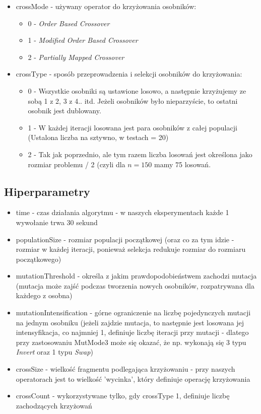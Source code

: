 \documentclass{article}
\begin{document}
\begin{itemize}
	\item crossMode	- używany operator do krzyżowania osobników:
		\begin{itemize}
			\item 0 - \textit{Order Based Crossover}
			\item 1 - \textit{Modified Order Based Crossover}
			\item 2 - \textit{Partially Mapped Crossover}
		\end{itemize}

	\item crossType - sposób przeprowadzenia i selekcji osobników do krzyżowania:
		\begin{itemize}
			\item 0 - Wszystkie osobniki są ustawione losowo, a następnie krzyżujemy ze sobą 1 z 2, 3 z 4.. itd. Jeżeli osobników było nieparzyście, to ostatni osobnik jest dublowany.
			\item 1 - W każdej iteracji losowana jest para osobników z całej populacji (Ustalona liczba na sztywno, w testach = 20)
			\item 2 - Tak jak poprzednio, ale tym razem liczba losowań jest określona jako rozmiar problemu / 2 (czyli dla $n = 150$ mamy 75 losowań.
		\end{itemize}
\end{itemize}

\subsection{Hiperparametry}
\begin{itemize}
	\item time - czas działania algorytmu - w naszych eksperymentach każde 1 wywołanie trwa 30 sekund
	\item populationSize - rozmiar populacji początkowej (oraz co za tym idzie - rozmiar w każdej iteracji, ponieważ selekcja redukuje rozmiar do rozmiaru początkowego)
	\item mutationThreshold - określa z jakim prawdopodobieństwem zachodzi mutacja (mutacja może zajść podczas tworzenia nowych osobników, rozpatrywana dla każdego z osobna)
	\item mutationIntensification - górne ograniczenie na liczbę pojedynczych mutacji na jednym osobniku (jeżeli zajdzie mutacja, to następnie jest losowana jej intensyfikacja, co najmniej 1, definiuje liczbę iteracji przy mutacji - dlatego przy zastosowaniu MutMode3 może się okazać, że np. wykonają się 3 typu \textit{Invert} oraz 1 typu \textit{Swap})
	\item crossSize - wielkość fragmentu podlegająca krzyżowaniu - przy naszych operatorach jest to wielkość 'wycinka', który definiuje operację krzyżowania
	\item crossCount - wykorzystywane tylko, gdy crossType 1, definiuje liczbę zachodzących krzyżowań
\end{itemize}
\end{document}
